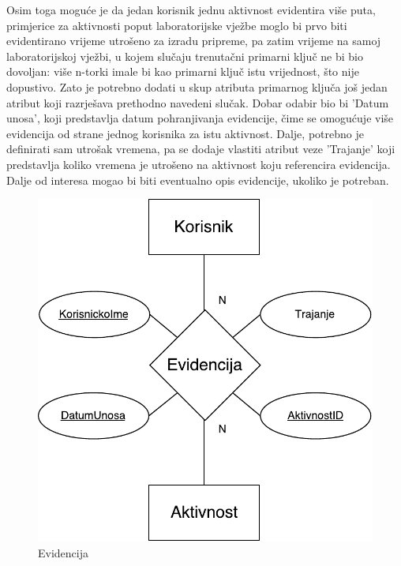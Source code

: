 \documentclass[times, utf8, zavrsni]{fer}
\begin{document}
Osim toga moguće je da jedan korisnik jednu aktivnost evidentira više puta, primjerice za aktivnosti poput laboratorijske vježbe moglo bi prvo biti evidentirano vrijeme utrošeno za izradu pripreme, pa zatim vrijeme na samoj laboratorijskoj vježbi, u kojem slučaju trenutačni primarni ključ ne bi bio dovoljan: više n-torki imale bi kao primarni ključ istu vrijednost, što nije dopustivo. Zato je potrebno dodati u skup atributa primarnog ključa još jedan atribut koji razrješava prethodno navedeni slučak. Dobar odabir bio bi 'Datum unosa', koji predstavlja datum pohranjivanja evidencije, čime se omogućuje više evidencija od strane jednog korisnika za istu aktivnost. Dalje, potrebno je definirati sam utrošak vremena, pa se dodaje vlastiti atribut veze 'Trajanje' koji predstavlja koliko vremena je utrošeno na aktivnost koju referencira evidencija. Dalje od interesa mogao bi biti eventualno opis evidencije, ukoliko je potreban.\\ 

\begin{figure}[H]
\centering
\includegraphics{img/evidencija.pdf}
\caption{Evidencija}
\label{fig:evidencija}
\end{figure}
\end{document}
